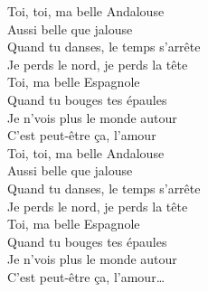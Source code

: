 \documentclass{novel}
\begin{document}
\begin{multicols}{2}
Toi, toi, ma belle Andalouse \\
Aussi belle que jalouse \\
Quand tu danses, le temps s'arrête \\
Je perds le nord, je perds la tête \\
Toi, ma belle Espagnole \\
Quand tu bouges tes épaules \\
Je n'vois plus le monde autour \\
C'est peut-être ça, l'amour \\

Toi, toi, ma belle Andalouse \\
Aussi belle que jalouse \\
Quand tu danses, le temps s'arrête \\
Je perds le nord, je perds la tête \\
Toi, ma belle Espagnole \\
Quand tu bouges tes épaules \\
Je n'vois plus le monde autour \\
C'est peut-être ça, l'amour… \\

\end{multicols}
\end{document}

